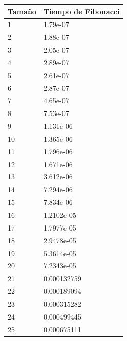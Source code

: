 \documentclass[a4paper, 11pt]{article}
\begin{document}
\begin{tabular}{|l|l|}
	\hline
	Tamaño & Tiempo de Fibonacci \\
	\hline
	\hline
1&1.79e-07 \\
\hline
2&1.88e-07\\
\hline
3&2.05e-07\\
\hline
4&2.89e-07\\
\hline
5&2.61e-07\\
\hline
6&2.87e-07\\
\hline
7&4.65e-07\\
\hline
8&7.53e-07\\
\hline
9&1.131e-06\\
\hline
10&1.365e-06\\
\hline
11&1.796e-06\\
\hline
12&1.671e-06\\
\hline
13&3.612e-06\\
\hline
14&7.294e-06\\
\hline
15&7.834e-06\\
\hline
16&1.2102e-05\\
\hline
17&1.7977e-05\\
\hline
18&2.9478e-05\\
\hline
19&5.3614e-05\\
\hline
20&7.2343e-05\\
\hline
21&0.000132759\\
\hline
22&0.000189094\\
\hline
23&0.000315282\\
\hline
24&0.000499445\\
\hline
25&0.000675111\\
\hline

\end{tabular}
\end{document}
